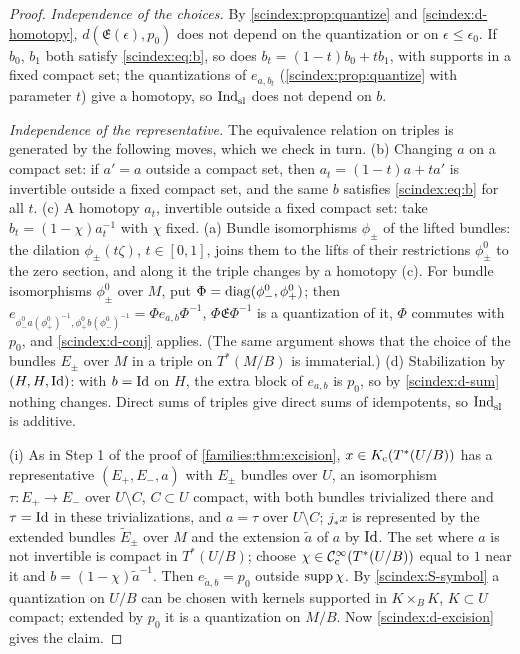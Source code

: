 \begin{proof}
  \emph{Independence of the choices.} By \cref{scindex:prop:quantize} and
  \ref{scindex:d-homotopy}, $d(\mathfrak E(\epsilon),p_0)$ does not depend on the
  quantization or on $\epsilon\le\epsilon_0$. If $b_0$, $b_1$ both satisfy
  \eqref{scindex:eq:b}, so does $b_t=(1-t)b_0+tb_1$, with supports in a fixed
  compact set; the quantizations of $e_{a,b_t}$ (\cref{scindex:prop:quantize}
  with parameter $t$) give a homotopy, so $\operatorname{Ind}^{}_{\mathrm{sl}}$ does not depend on $b$.

  \emph{Independence of the representative.} The equivalence relation on triples
  is generated by the following moves, which we check in turn. (b) Changing $a$
  on a compact set: if $a'=a$ outside a compact set, then $a_t=(1-t)a+ta'$ is
  invertible outside a fixed compact set, and the same $b$ satisfies
  \eqref{scindex:eq:b} for all $t$. (c) A homotopy $a_t$, invertible outside a
  fixed compact set: take $b_t=(1-\chi)a_t^{-1}$ with $\chi$ fixed. (a) Bundle
  isomorphisms $\phi_\pm$ of the lifted bundles: the dilation $\phi_\pm(t\zeta)$,
  $t\in[0,1]$, joins them to the lifts of their restrictions $\phi^0_\pm$ to the
  zero section, and along it the triple changes by a homotopy (c). For bundle
  isomorphisms $\phi_\pm^0$ over $M$, put $\Phi=\operatorname{diag}(\phi^0_-,\phi^0_+)$; then
  $e_{\phi^0_-a(\phi^0_+)^{-1},\phi^0_+b(\phi^0_-)^{-1}}=\Phi e_{a,b}\Phi^{-1}$,
  $\Phi\mathfrak E\Phi^{-1}$ is a quantization of it, $\Phi$ commutes with $p_0$,
  and \ref{scindex:d-conj} applies. (The same argument shows that the choice of
  the bundles $E_\pm$ over $M$ in a triple on $T^*(M/B)$ is immaterial.)
  (d) Stabilization by $(H,H,\operatorname{Id})$: with $b=\operatorname{Id}$ on $H$, the extra block of
  $e_{a,b}$ is $p_0$, so by \ref{scindex:d-sum} nothing changes. Direct sums of
  triples give direct sums of idempotents, so $\operatorname{Ind}^{}_{\mathrm{sl}}$ is additive.

  (i) As in Step 1 of the proof of \cref{families:thm:excision},
  $x\in K_{\mathrm{c}}(T^*(U/B))$ has a representative $(E_+,E_-,a)$ with $E_\pm$ bundles over
  $U$, an isomorphism $\tau:E_+\to E_-$ over $U\setminus C$, $C\subset U$ compact,
  with both bundles trivialized there and $\tau=\operatorname{Id}$ in these trivializations, and
  $a=\tau$ over $U\setminus C$; $j_*x$ is represented by the extended bundles
  $\tilde E_\pm$ over $M$ and the extension $\tilde a$ of $a$ by $\operatorname{Id}$. The set
  where $a$ is not invertible is compact in $T^*(U/B)$; choose $\chi\in
  \mathcal{C}^\infty_{\mathrm{c}}(T^*(U/B))$ equal to $1$ near it and $b=(1-\chi)\tilde a^{-1}$. Then
  $e_{\tilde a,b}=p_0$ outside $\operatorname{supp}\chi$. By \ref{scindex:S-symbol} a
  quantization on $U/B$ can be chosen with kernels supported in $K\times_BK$,
  $K\subset U$ compact; extended by $p_0$ it is a quantization on $M/B$. Now
  \ref{scindex:d-excision} gives the claim.


\end{proof}
